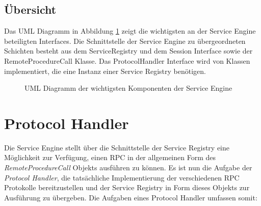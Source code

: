 \subsection{Übersicht}
Das \ac{UML} Diagramm in Abbildung \ref{ill:serviceengine_uml} zeigt die
wichtigsten an der Service Engine beteiligten Interfaces. Die Schnittstelle der
Service Engine zu übergeordneten Schichten besteht aus dem ServiceRegistry und
dem Session Interface sowie der RemoteProcedureCall Klasse. Das ProtocolHandler
Interface wird von Klassen implementiert, die eine Instanz einer Service Registry
benötigen.

\begin{figure}[bth]
	\caption{UML Diagramm der wichtigsten Komponenten der Service Engine}
	\label{ill:serviceengine_uml}
\end{figure}

\pagebreak
\section{Protocol Handler}\label{sec:protocolhandler}
Die Service Engine stellt über die Schnittstelle der Service Registry eine
Möglichkeit zur Verfügung, einen \ac{RPC} in der allgemeinen Form des
\emph{RemoteProcedureCall} Objekts ausführen zu können. Es ist nun die Aufgabe
der \emph{Protocol Handler}, die tatsächliche Implementierung der verschiedenen
\ac{RPC} Protokolle bereitzustellen und der Service Registry in Form dieses
Objekts zur Ausführung zu übergeben. Die Aufgaben eines Protocol Handler umfassen
somit:

